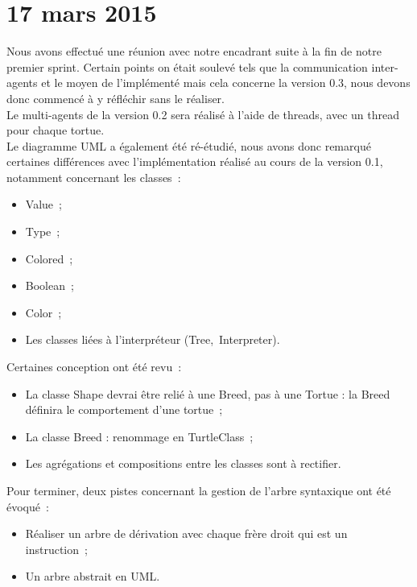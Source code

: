 \section{17 mars 2015}

Nous avons effectué une réunion avec notre encadrant suite à la fin de notre premier sprint. Certain points on était soulevé tels que la communication inter-agents et le moyen de l'implémenté mais cela concerne la version 0.3, nous devons donc commencé à y réfléchir sans le réaliser.
\\
Le multi-agents de la version 0.2 sera réalisé à l'aide de threads, avec un thread pour chaque tortue.
\\
Le diagramme UML a également été ré-étudié, nous avons donc remarqué certaines différences avec l'implémentation réalisé au cours de la version 0.1, notamment concernant les classes~: 
\begin{itemize}
\item Value~;
\item Type~;
\item Colored~;
\item Boolean~;
\item Color~;
\item Les classes liées à l'interpréteur (Tree,~Interpreter).
\end{itemize}


Certaines conception ont été revu~:
\begin{itemize} 
\item La classe Shape devrai être relié à une Breed, pas à une Tortue : la Breed définira le comportement d'une tortue~;
\item La classe Breed : renommage en TurtleClass~;
\item Les agrégations et compositions entre les classes sont à rectifier.
\end{itemize}


Pour terminer, deux pistes concernant la gestion de l'arbre syntaxique ont été évoqué~:
\begin{itemize}
\item Réaliser un arbre de dérivation avec chaque frère droit qui est un instruction~;
\item Un arbre abstrait en UML.
\end{itemize}
